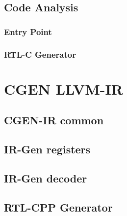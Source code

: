 \documentclass{article}
\begin{document}
\subsection{Code Analysis}
\subsubsection{Entry Point}
\subsubsection{RTL-C Generator}

\clearpage
\section{CGEN LLVM-IR} \label{sec:cgen-llvm-ir}
\subsection{CGEN-IR common}
\subsection{IR-Gen registers}
\subsection{IR-Gen decoder}
\subsection{RTL-CPP Generator}
\end{document}
